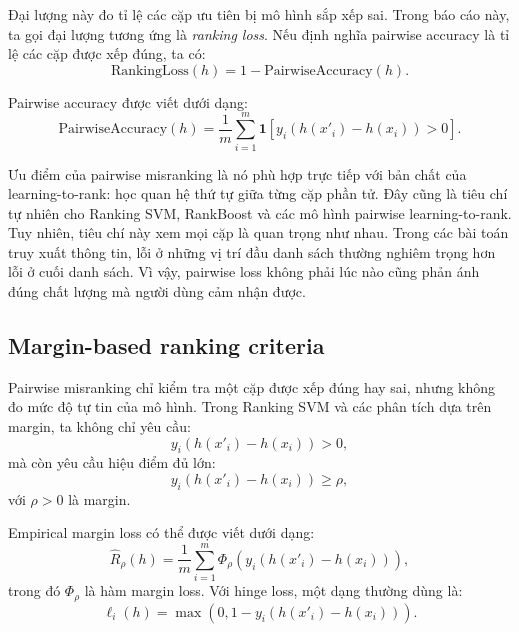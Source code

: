 Đại lượng này đo tỉ lệ các cặp ưu tiên bị mô hình sắp xếp sai. Trong báo cáo này, ta gọi đại lượng tương ứng là \textit{ranking loss}. Nếu định nghĩa pairwise accuracy là tỉ lệ các cặp được xếp đúng, ta có:
\begin{equation}
    \text{RankingLoss}(h)
    =
    1 - \text{PairwiseAccuracy}(h).
    \label{eq:discussion-ranking-loss-pairwise-accuracy}
\end{equation}

Pairwise accuracy được viết dưới dạng:
\begin{equation}
    \text{PairwiseAccuracy}(h)
    =
    \frac{1}{m}
    \sum_{i=1}^{m}
    \mathbf{1}
    \left[
        y_i(h(x'_i)-h(x_i)) > 0
    \right].
    \label{eq:discussion-pairwise-accuracy}
\end{equation}

Ưu điểm của pairwise misranking là nó phù hợp trực tiếp với bản chất của learning-to-rank: học quan hệ thứ tự giữa từng cặp phần tử. Đây cũng là tiêu chí tự nhiên cho Ranking SVM, RankBoost và các mô hình pairwise learning-to-rank. Tuy nhiên, tiêu chí này xem mọi cặp là quan trọng như nhau. Trong các bài toán truy xuất thông tin, lỗi ở những vị trí đầu danh sách thường nghiêm trọng hơn lỗi ở cuối danh sách. Vì vậy, pairwise loss không phải lúc nào cũng phản ánh đúng chất lượng mà người dùng cảm nhận được.

\subsection{Margin-based ranking criteria}

Pairwise misranking chỉ kiểm tra một cặp được xếp đúng hay sai, nhưng không đo mức độ tự tin của mô hình. Trong Ranking SVM và các phân tích dựa trên margin, ta không chỉ yêu cầu:
\begin{equation}
    y_i(h(x'_i)-h(x_i)) > 0,
    \label{eq:discussion-positive-margin-condition}
\end{equation}
mà còn yêu cầu hiệu điểm đủ lớn:
\begin{equation}
    y_i(h(x'_i)-h(x_i)) \geq \rho,
    \label{eq:discussion-rho-margin-condition}
\end{equation}
với \(\rho > 0\) là margin.

Empirical margin loss có thể được viết dưới dạng:
\begin{equation}
    \widehat{R}_{\rho}(h)
    =
    \frac{1}{m}
    \sum_{i=1}^{m}
    \Phi_{\rho}
    \left(
        y_i(h(x'_i)-h(x_i))
    \right),
    \label{eq:discussion-empirical-margin-loss}
\end{equation}
trong đó \(\Phi_{\rho}\) là hàm margin loss. Với hinge loss, một dạng thường dùng là:
\begin{equation}
    \ell_i(h)
    =
    \max
    \left(
        0,
        1 - y_i(h(x'_i)-h(x_i))
    \right).
    \label{eq:discussion-pairwise-hinge-loss}
\end{equation}

